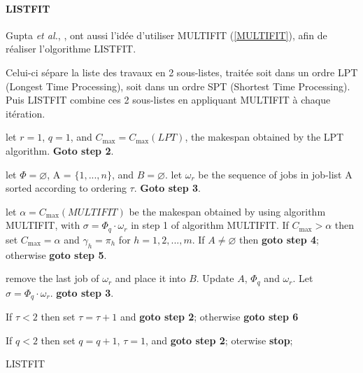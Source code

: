 \documentclass[a4paper,12pt]{report}
\theoremstyle{plain}				%
\theoremstyle{definition}				%
\begin{document}
\paragraph{LISTFIT}

Gupta \textit{et al.}, \cite{gupta2001listfit}, ont aussi l'idée d'utiliser MULTIFIT (\ref{MULTIFIT}), afin de réaliser l'olgorithme LISTFIT.

Celui-ci sépare la liste des travaux en 2 sous-listes, traitée soit dans un ordre LPT (Longest Time Processing), soit dans un ordre SPT (Shortest Time Processing). Puis LISTFIT combine ces 2 sous-listes en appliquant MULTIFIT à chaque itération.

\bigskip
\begin{algorithm}[H]
\DontPrintSemicolon
{}

let $r=1$, $q=1$, and $C_{\max}=C_{\max}(LPT)$, the makespan obtained by the LPT algorithm. \textbf{Goto step 2}.

\BlankLine %
let $\Phi = \varnothing$, A = $\{1,...,n\}$, and $B = \varnothing$. let $\omega_r$ be the sequence of jobs in job-list A sorted according to ordering $\tau$. \textbf{Goto step 3}.

\BlankLine %
let $\alpha=C_{\max}(MULTIFIT)$ be the makespan obtained by using algorithm MULTIFIT, with $\sigma = \Phi_q \cdot \omega_r$ in step 1 of algorithm MULTIFIT.
If $C_{\max}>\alpha$ then set $C_{\max} = \alpha$ and $\gamma_h = \pi_h$ for $h=1,2,...,m$. If $A \neq \varnothing$ then \textbf{goto step 4}; otherwise \textbf{goto step 5}.

\BlankLine %
remove the last job of $\omega_r$ and place it into $B$. Update $A$, $\Phi_q$ and $\omega_r$. Let $\sigma = \Phi_q \cdot \omega_r$. \textbf{goto step 3}.

\BlankLine %
If {$\tau < 2$} then set $\tau = \tau + 1$ and	\textbf{goto step 2}; otherwise \textbf{goto step 6}

\BlankLine %
If $q<2$ then set $q=q+1$, $\tau = 1$, and \textbf{goto step 2}; oterwise \textbf{stop}; 

\caption{LISTFIT\label{LISTFIT}}
\end{algorithm}
\end{document}
